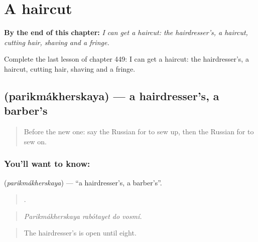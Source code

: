 
\chapter{A haircut}
\label{ch:ru-a-haircut}

\begin{chapteropening}
\textbf{By the end of this chapter:} \emph{I can get a haircut: the hairdresser's, a haircut, cutting hair, shaving and a fringe.}

Complete the last lesson of chapter 449: I can get a haircut: the hairdresser's, a haircut, cutting hair, shaving and a fringe.
\end{chapteropening}

\section[\texorpdfstring{\ru{парикмахерская} (parikmákherskaya)}{парикмахерская (parikmákherskaya)}]{ (parikmákherskaya) — a hairdresser's, a barber's}

\label{lesson:RU-C449-parikmakherskaya}



\begin{quote}
Before the new one: say the Russian for to sew up, then the Russian for to sew on.
\end{quote}

\subsection*{You'll want to know: }
\textbf{} (\emph{parikmákherskaya}) — \textquotedblleft{}a hairdresser's, a barber's\textquotedblright{}.

\begin{quote}
   .
\end{quote}

\begin{quote}
\emph{Parikmákherskaya rabótayet do vosmí.}
\end{quote}

\begin{quote}
The hairdresser's is open until eight.
\end{quote}

